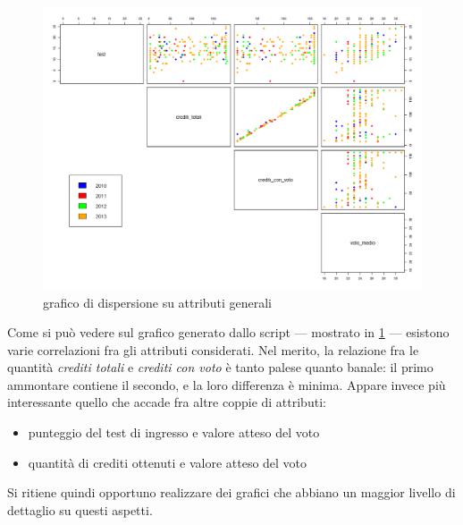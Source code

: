 \begin{figure}
    \centering
    \caption{grafico di dispersione su attributi generali}
    \label{fig1}
	\includegraphics[scale=0.32]{img/scatter_plot_1_gen.png}
\end{figure}

Come si può vedere sul grafico generato dallo script --- mostrato in \ref{fig1} --- esistono varie correlazioni fra gli attributi considerati. Nel merito, la relazione fra le quantità \textit{crediti totali} e \textit{crediti con voto} è tanto palese quanto banale: il primo ammontare contiene il secondo, e la loro differenza è minima. Appare invece più interessante quello che accade fra altre coppie di attributi:

\begin{itemize}
    \item punteggio del test di ingresso e valore atteso del voto 
    \item quantità di crediti ottenuti e valore atteso del voto
\end{itemize}

Si ritiene quindi opportuno realizzare dei grafici che abbiano un maggior livello di dettaglio su questi aspetti.

